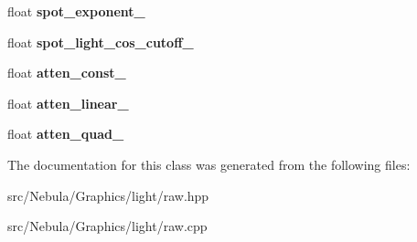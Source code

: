 \begin{DoxyCompactItemize}
\item 
\hypertarget{classNeb_1_1light_1_1raw_a0792c8c37e844e90e6c32ca21498a6af}{float {\bfseries spot\-\_\-exponent\-\_\-}}\label{classNeb_1_1light_1_1raw_a0792c8c37e844e90e6c32ca21498a6af}

\item 
\hypertarget{classNeb_1_1light_1_1raw_a82f9363440e26beafe2a564430755643}{float {\bfseries spot\-\_\-light\-\_\-cos\-\_\-cutoff\-\_\-}}\label{classNeb_1_1light_1_1raw_a82f9363440e26beafe2a564430755643}

\item 
\hypertarget{classNeb_1_1light_1_1raw_a623d2976e8ac56575811603f4db06cbe}{float {\bfseries atten\-\_\-const\-\_\-}}\label{classNeb_1_1light_1_1raw_a623d2976e8ac56575811603f4db06cbe}

\item 
\hypertarget{classNeb_1_1light_1_1raw_a6da19a1d6e432f84d084019064164737}{float {\bfseries atten\-\_\-linear\-\_\-}}\label{classNeb_1_1light_1_1raw_a6da19a1d6e432f84d084019064164737}

\item 
\hypertarget{classNeb_1_1light_1_1raw_abec497c49456c6714c60174f0d07201d}{float {\bfseries atten\-\_\-quad\-\_\-}}\label{classNeb_1_1light_1_1raw_abec497c49456c6714c60174f0d07201d}

\end{DoxyCompactItemize}


\-The documentation for this class was generated from the following files\-:\begin{DoxyCompactItemize}
\item 
src/\-Nebula/\-Graphics/light/raw.\-hpp\item 
src/\-Nebula/\-Graphics/light/raw.\-cpp\end{DoxyCompactItemize}
